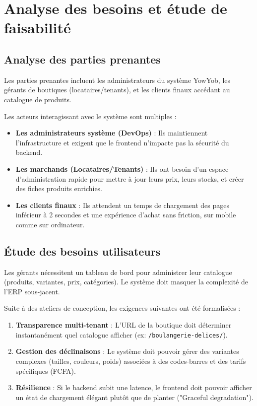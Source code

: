\documentclass[12pt, a4paper]{report}
\begin{document}
\chapter{Analyse des besoins et étude de faisabilité}
\section{Analyse des parties prenantes}
Les parties prenantes incluent les administrateurs du système YowYob, les gérants de boutiques (locataires/tenants), et les clients finaux accédant au catalogue de produits.

Les acteurs interagissant avec le système sont multiples :
\begin{itemize}
    \item \textbf{Les administrateurs système (DevOps)} : Ils maintiennent l'infrastructure et exigent que le frontend n'impacte pas la sécurité du backend.
    \item \textbf{Les marchands (Locataires/Tenants)} : Ils ont besoin d'un espace d'administration rapide pour mettre à jour leurs prix, leurs stocks, et créer des fiches produits enrichies.
    \item \textbf{Les clients finaux} : Ils attendent un temps de chargement des pages inférieur à 2 secondes et une expérience d'achat sans friction, sur mobile comme sur ordinateur.
\end{itemize}
\section{Étude des besoins utilisateurs}
Les gérants nécessitent un tableau de bord pour administrer leur catalogue (produits, variantes, prix, catégories). Le système doit masquer la complexité de l'ERP sous-jacent.

Suite à des ateliers de conception, les exigences suivantes ont été formalisées :
\begin{enumerate}
    \item \textbf{Transparence multi-tenant} : L'URL de la boutique doit déterminer instantanément quel catalogue afficher (ex: \texttt{/boulangerie-delices/}).
    \item \textbf{Gestion des déclinaisons} : Le système doit pouvoir gérer des variantes complexes (tailles, couleurs, poids) associées à des codes-barres et des tarifs spécifiques (FCFA).
    \item \textbf{Résilience} : Si le backend subit une latence, le frontend doit pouvoir afficher un état de chargement élégant plutôt que de planter ("Graceful degradation").
\end{enumerate}
\end{document}
